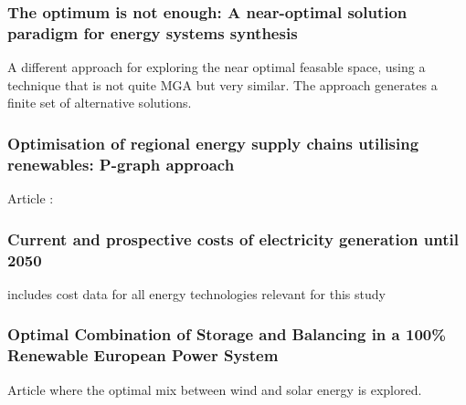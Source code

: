 \subsubsection*{The optimum is not enough: A near-optimal solution paradigm for energy systems synthesis \cite{Optimum_not_enough}}
A different approach for exploring the near optimal feasable space, using a technique that is not quite MGA but very similar. The approach generates a finite set of alternative solutions. 

\subsubsection*{Optimisation of regional energy supply chains utilising renewables: P-graph approach}
Article : \cite{P_graph}

\subsubsection*{Current and prospective costs of electricity generation until 2050}
\cite{Schroder2013Current} includes cost data for all energy technologies relevant for this study

\subsubsection*{Optimal Combination of Storage and Balancing in a 100\% Renewable European Power System}
\cite{rasmussen2011a}
Article where the optimal mix between wind and solar energy is explored. 

